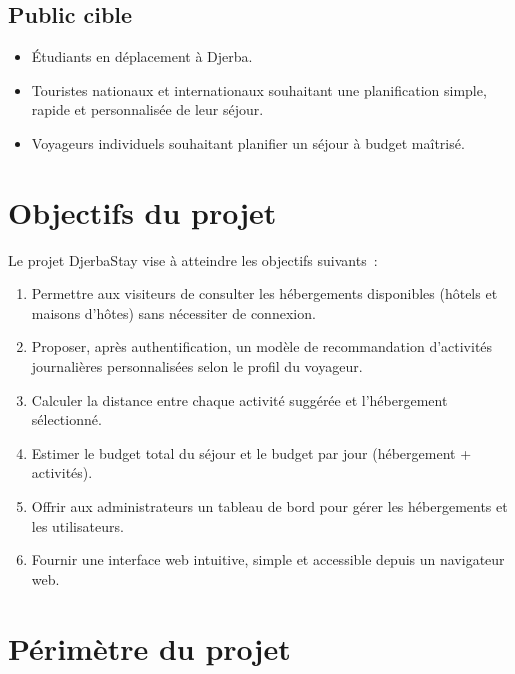 \documentclass[12pt,a4paper]{report}
\begin{document}
\section{Public cible}

\begin{itemize}
  \item Étudiants en déplacement à Djerba.
  \item Touristes nationaux et internationaux souhaitant une planification
        simple, rapide et personnalisée de leur séjour.
  \item Voyageurs individuels souhaitant planifier un séjour à budget maîtrisé.
\end{itemize}

\chapter{Objectifs du projet}

Le projet DjerbaStay vise à atteindre les objectifs suivants~:

\begin{enumerate}
  \item Permettre aux visiteurs de consulter les hébergements disponibles
        (hôtels et maisons d'hôtes) sans nécessiter de connexion.
  \item Proposer, après authentification, un modèle de recommandation
        d'activités journalières personnalisées selon le profil du voyageur.
  \item Calculer la distance entre chaque activité suggérée et l'hébergement
        sélectionné.
  \item Estimer le budget total du séjour et le budget par jour (hébergement +
        activités).
  \item Offrir aux administrateurs un tableau de bord pour gérer les
        hébergements et les utilisateurs.
  \item Fournir une interface web intuitive, simple et accessible depuis un
        navigateur web.
\end{enumerate}

\chapter{Périmètre du projet}
\end{document}
